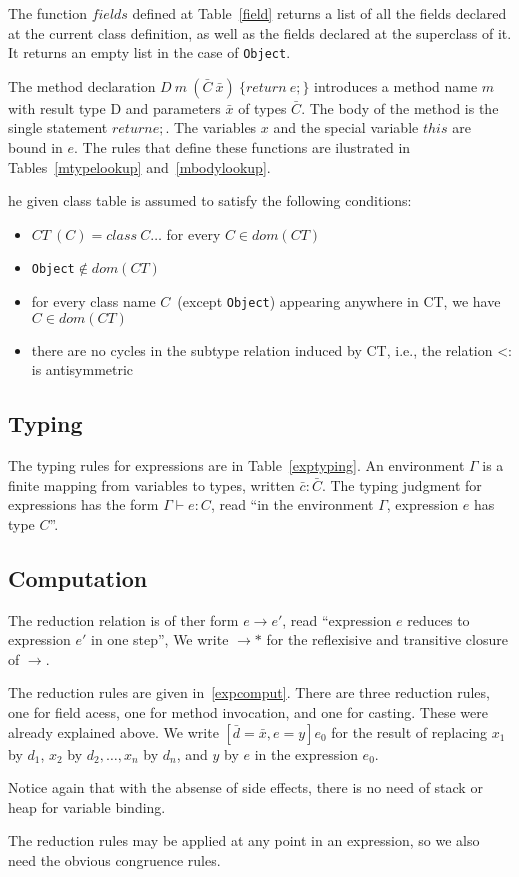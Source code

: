 The function $fields$ defined at Table~\ref{field} returns a list of all
the fields declared at the current class definition, as well as the fields
declared at the superclass of it. It returns an empty list in the case of
\texttt{Object}.


The method declaration $D\ m~(\bar{C}\ \bar{x})\ \{return\ e;\}$
introduces a method name $m$ with result type D and parameters
$\bar{x}$ of types $\bar{C}$. The body of the method is the single
statement $return e;$. The variables ${x}$ and the special
variable ${this}$ are bound in ${e}$. The rules that define these
functions are ilustrated in Tables~\ref{mtypelookup} and~\ref{mbodylookup}.

he given class table is assumed to satisfy the following conditions:
\begin{itemize}
	\item $ CT~(C)=class\ C\ldots$ for every $C\in dom(CT)$
	\item \texttt{Object}$\notin dom(CT)$
	\item for every class name $C$~(except \texttt{Object}) appearing anywhere
		in CT, we have $C\in dom(CT)$
	\item there are no cycles in the subtype relation induced by CT, i.e., the
		relation <: is antisymmetric
\end{itemize}

\subsection{Typing}

The typing rules for expressions are in Table~\ref{exptyping}. An environment
$\Gamma$ is a finite mapping from variables to types, written $\bar{c}:\bar{C}$.
The typing judgment for expressions has the form $\Gamma \vdash e: C$, read ``in
the environment $\Gamma$, expression $e$ has type $C$''.

\subsection{Computation}
The reduction relation is of ther form $e \rightarrow e'$, read ``expression
$e$ reduces to expression $e'$ in one step'', We write $\rightarrow *$ for the
reflexisive and transitive closure of $\rightarrow$.

The reduction rules are given in~\ref{expcomput}. There are three reduction
rules, one for field acess, one for method invocation, and one for casting.
These were already explained above. We write $[\bar{d}=\bar{x}, e=y]e_0$ for
the result of replacing $x_1$ by $d_1$, $x_2$ by $d_2, \dots, x_n$ by $d_n$, and $y$ by $e$ in
the expression $e_0$.

Notice again that with the absense of side effects, there is no need of stack
or heap for variable binding. 

The reduction rules may be applied at any point in an expression, so we also
need the obvious congruence rules.

